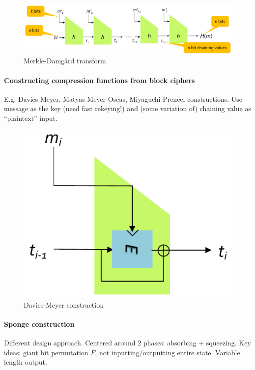 \begin{figure}[h]
    \centering
	\includegraphics[scale=0.4]{images/merkle-damgard.png}
    \caption{Merkle-Damgård transform}
    \label{fig:merkle-damgard}
\end{figure}

\paragraph{Constructing compression functions from block ciphers}
E.g. Davies-Meyer, Matyas-Meyer-Oseas, Miyaguchi-Preneel constructions.
Use message as the key (need fast rekeying!) and (some variation of) chaining value as ``plaintext'' input.

\begin{figure}[h]
    \centering
	\includegraphics[scale=0.35]{images/davies-meyer.png}
    \caption{Davies-Meyer construction}
    \label{fig:davies-meyer}
\end{figure}

\paragraph{Sponge construction}
Different design approach.
Centered around 2 phases: absorbing + squeezing.
Key ideas: giant bit permutation $F$, not inputting/outputting entire state.
Variable length output.

